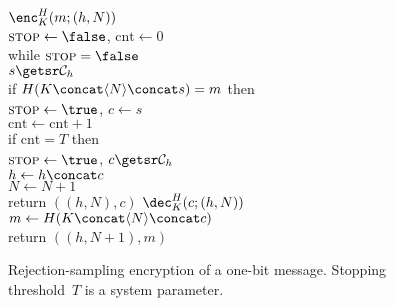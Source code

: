 
\newcommand{\stoploop}{\textsc{stop}}
\newcommand{\cnt}{\mathrm{cnt}}
\newcommand{\outputs}{\Rightarrow} 
\newcommand{\bad}{\textsc{bad}}
\newcommand{\marked}{0}%
\newcommand{\keyguess}{\textsc{key}}
\newcommand{\sampguess}{\textsc{samp}}

\begin{figure}[tph]
\begin{center}
{
\underline{$\enc^H_K(m;(h,N))$}\\[2pt]
$\stoploop\gets\false$, $\cnt\gets 0$\\
while $\stoploop=\false$\\
\nudge $s \getsr \mathcal{C}_h$\\
\nudge if $H(K \concat \langle N \rangle \concat s)=m$ then \\
\nudge\nudge $\stoploop\gets\true$, $c\gets s$\\
\nudge $\cnt \gets \cnt+1$\\
\nudge if $\cnt = T$ then\\
\nudge\nudge $\stoploop\gets\true$, $c \getsr \mathcal{C}_h$\\
$h \gets h \concat c$\\
$N \gets N+1$\\ 
return $((h,N),c)$
}
{
\underline{$\dec^H_K(c;(h,N))$}\\[2pt]
$m \gets H(K \concat \langle N \rangle \concat c)$\\
return $((h,N+1),m)$
}

\caption{Rejection-sampling encryption of a one-bit
  message. Stopping threshold~$T$ is a system
  parameter.}
\label{fig:rejection-one-bit}
\end{center}
\end{figure}


